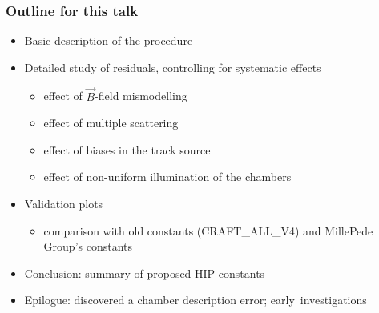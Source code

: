 \documentclass[compress]{beamer}
\begin{document}
\begin{frame}
\frametitle{Outline for this talk}
\begin{itemize}\setlength{\itemsep}{0.25 cm}
\item Basic description of the procedure
\item Detailed study of residuals, controlling for systematic effects
\begin{itemize}
\item effect of $\vec{B}$-field mismodelling
\item effect of multiple scattering
\item effect of biases in the track source
\item effect of non-uniform illumination of the chambers
\end{itemize}

\item Validation plots
\begin{itemize}
\item comparison with old constants (CRAFT\_ALL\_V4) and MillePede Group's constants
\end{itemize}

\item Conclusion: summary of proposed HIP constants

\item Epilogue: discovered a chamber description error; \mbox{early investigations\hspace{-1 cm}}
\end{itemize}
\end{frame}
\end{document}
